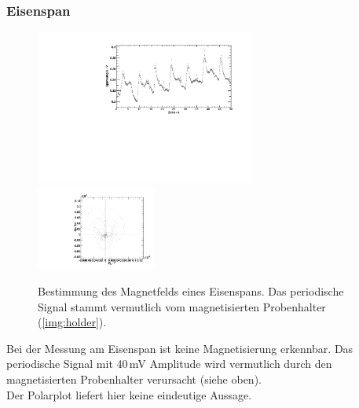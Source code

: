 \subsubsection{Eisenspan}
\begin{figure}[H]
\begin{center}
  \includegraphics[width=0.64\textwidth]{../img/Fe-Span.pdf}
  \includegraphics[width=0.35\textwidth]{../img/polar_Fe-Span.pdf}
  \caption{Bestimmung des Magnetfelds eines Eisenspans. Das periodische Signal stammt vermutlich
  vom magnetisierten Probenhalter (\autoref{img:holder}).}
  \label{img:fespan}
\end{center}
\end{figure}
Bei der Messung am Eisenspan ist keine Magnetisierung erkennbar.
Das periodische Signal mit 40\,mV Amplitude wird vermutlich durch den magnetisierten Probenhalter
verursacht (siehe oben).\\
Der Polarplot liefert hier keine eindeutige Aussage.


